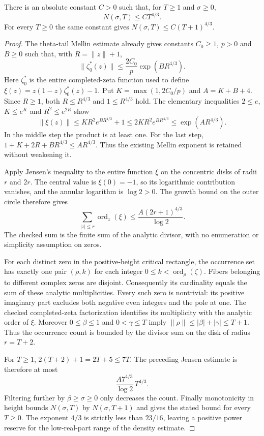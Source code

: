 \begin{lemma}
\label{analytic:crude-zero-count}
\leanok
There is an absolute constant $C>0$ such that, for $T\ge1$ and
$\sigma\ge0$,
\[
 N(\sigma,T)\le C T^{4/3}.
\]
For every $T\ge0$ the same constant gives
$N(\sigma,T)\le C(T+1)^{4/3}$.
\end{lemma}
\begin{proof}
The theta-tail Mellin estimate already gives constants $C_0\ge1$,
$p>0$ and $B\ge0$ such that, with $R=\lVert z\rVert+1$,
\[
 \lVert\zeta_0^*(z)\rVert
 \le \frac{2C_0}{p}\exp(BR^{4/3}).
\]
Here $\zeta_0^*$ is the entire completed-zeta function used to define
$\xi(z)=z(1-z)\zeta_0^*(z)-1$.
Put $K=\max(1,2C_0/p)$ and $A=K+B+4$.
Since $R\ge1$, both $R\le R^{4/3}$ and $1\le R^{4/3}$ hold.
The elementary inequalities
$2\le e$, $K\le e^K$ and $R^2\le e^{2R}$ show
\[
 \lVert\xi(z)\rVert
 \le K R^2 e^{BR^{4/3}}+1
 \le 2K R^2 e^{BR^{4/3}}
 \le \exp(A R^{4/3}).
\]
In the middle step the product is at least one.
For the last step,
$1+K+2R+BR^{4/3}\le A R^{4/3}$.
Thus the existing Mellin exponent is retained without weakening it.

Apply Jensen's inequality to the entire function $\xi$ on the
concentric disks of radii $r$ and $2r$.
The central value is $\xi(0)=-1$, so its logarithmic contribution
vanishes, and the annular logarithm is $\log2>0$.
The growth bound on the outer circle therefore gives
\[
 \sum_{|z|\le r}\operatorname{ord}_z(\xi)
 \le \frac{A(2r+1)^{4/3}}{\log2}.
\]
The checked sum is the finite sum of the analytic divisor, with no
enumeration or simplicity assumption on zeros.

For each distinct zero in the positive-height critical rectangle,
the occurrence set has exactly one pair $(\rho,k)$ for each integer
$0\le k<\operatorname{ord}_\rho(\zeta)$.
Fibers belonging to different complex zeros are disjoint.
Consequently its cardinality equals the sum of these analytic
multiplicities.
Every such zero is nontrivial: its positive imaginary part excludes
both negative even integers and the pole at one.
The checked completed-zeta factorization identifies its multiplicity
with the analytic order of $\xi$.
Moreover $0\le\beta\le1$ and $0<\gamma\le T$ imply
$\lVert\rho\rVert\le|\beta|+|\gamma|\le T+1$.
Thus the occurrence count is bounded by the divisor sum on the disk
of radius $r=T+2$.

For $T\ge1$, $2(T+2)+1=2T+5\le7T$.
The preceding Jensen estimate is therefore at most
\[
 \frac{A7^{4/3}}{\log2}\,T^{4/3}.
\]
Filtering further by $\beta\ge\sigma\ge0$ only decreases the count.
Finally monotonicity in height bounds $N(\sigma,T)$ by
$N(\sigma,T+1)$ and gives the stated bound for every $T\ge0$.
The exponent $4/3$ is strictly less than $23/16$, leaving a positive
power reserve for the low-real-part range of the density estimate.
\end{proof}


